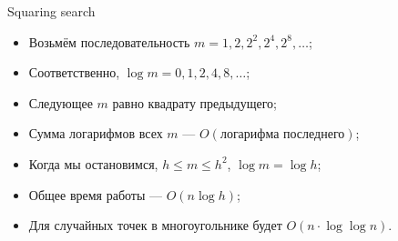 \begin{frame}{Squaring search}
\begin{itemize}
  \item Возьмём последовательность \(m = 1, 2, 2^2, 2^4, 2^8, \ldots\);
  \item Соответственно, \(\log m = 0, 1, 2, 4, 8, \ldots\);
  \item Следующее \(m\) равно квадрату предыдущего;
  \item Сумма логарифмов всех \(m\) — \(O(\text{логарифма последнего})\);
  \item Когда мы остановимся, \(h \le m \le h^2\), \(\log m = \log h\);
  \item Общее время работы — \(O (n \log h)\);
  \item Для случайных точек в многоугольнике будет \(O (n \cdot \log \log n)\).
\end{itemize}
\end{frame}

